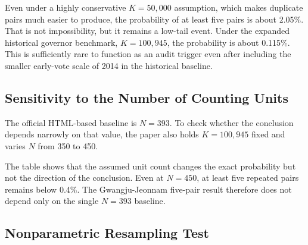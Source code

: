\documentclass[preprint]{../ieie/IEIE}
\begin{document}
Even under a highly conservative \(K=50,000\) assumption, which makes duplicate pairs much easier to produce, the probability of at least five pairs is about 2.05\%. That is not impossibility, but it remains a low-tail event. Under the expanded historical governor benchmark, \(K=100,945\), the probability is about 0.115\%. This is sufficiently rare to function as an audit trigger even after including the smaller early-vote scale of 2014 in the historical baseline.

\subsection{Sensitivity to the Number of Counting Units}

The official HTML-based baseline is \(N=393\). To check whether the conclusion depends narrowly on that value, the paper also holds \(K=100,945\) fixed and varies \(N\) from 350 to 450.

\begin{center}
\scriptsize
{}
\end{center}

The table shows that the assumed unit count changes the exact probability but not the direction of the conclusion. Even at \(N=450\), at least five repeated pairs remains below 0.4\%. The Gwangju-Jeonnam five-pair result therefore does not depend only on the single \(N=393\) baseline.

\subsection{Nonparametric Resampling Test}
\end{document}

